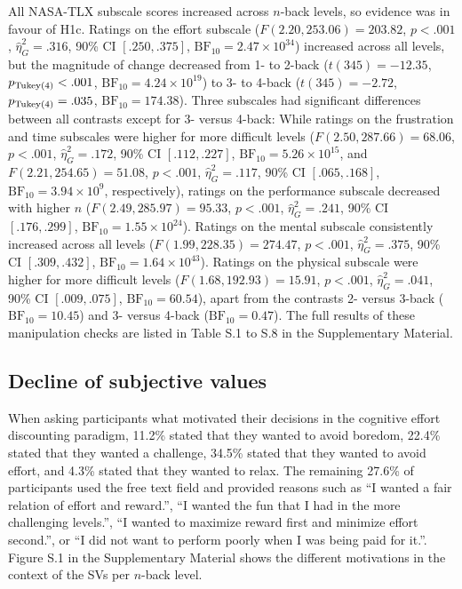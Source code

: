 \documentclass[
  man,floatsintext]{apa6}
\begin{document}
All NASA-TLX subscale scores increased across \(n\)-back levels, so evidence was in favour of H1c.
Ratings on the effort subscale (\(F(2.20, 253.06) = 203.82\), \(p < .001\), \(\hat{\eta}^2_G = .316\), 90\% CI \([.250, .375]\), \(\mathrm{BF}_{\textrm{10}} = 2.47 \times 10^{34}\)) increased across all levels, but the magnitude of change decreased from 1- to 2-back (\(t(345) = -12.35\), \(p_\mathrm{\scriptsize Tukey(4)} < .001\), \(\mathrm{BF}_{\textrm{10}} = 4.24 \times 10^{19}\)) to 3- to 4-back (\(t(345) = -2.72\), \(p_\mathrm{\scriptsize Tukey(4)} = .035\), \(\mathrm{BF}_{\textrm{10}} = 174.38\)).
Three subscales had significant differences between all contrasts except for 3- versus 4-back:
While ratings on the frustration and time subscales were higher for more difficult levels (\(F(2.50, 287.66) = 68.06\), \(p < .001\), \(\hat{\eta}^2_G = .172\), 90\% CI \([.112, .227]\), \(\mathrm{BF}_{\textrm{10}} = 5.26 \times 10^{15}\), and \(F(2.21, 254.65) = 51.08\), \(p < .001\), \(\hat{\eta}^2_G = .117\), 90\% CI \([.065, .168]\), \(\mathrm{BF}_{\textrm{10}} = 3.94 \times 10^{9}\), respectively), ratings on the performance subscale decreased with higher \(n\) (\(F(2.49, 285.97) = 95.33\), \(p < .001\), \(\hat{\eta}^2_G = .241\), 90\% CI \([.176, .299]\), \(\mathrm{BF}_{\textrm{10}} = 1.55 \times 10^{24}\)).
Ratings on the mental subscale consistently increased across all levels (\(F(1.99, 228.35) = 274.47\), \(p < .001\), \(\hat{\eta}^2_G = .375\), 90\% CI \([.309, .432]\), \(\mathrm{BF}_{\textrm{10}} = 1.64 \times 10^{43}\)).
Ratings on the physical subscale were higher for more difficult levels (\(F(1.68, 192.93) = 15.91\), \(p < .001\), \(\hat{\eta}^2_G = .041\), 90\% CI \([.009, .075]\), \(\mathrm{BF}_{\textrm{10}} = 60.54\)), apart from the contrasts 2- versus 3-back (\(\mathrm{BF}_{\textrm{10}} = 10.45\)) and 3- versus 4-back (\(\mathrm{BF}_{\textrm{10}} = 0.47\)).
The full results of these manipulation checks are listed in Table S.1 to S.8 in the Supplementary Material.

\hypertarget{decline-of-subjective-values}{%
\subsection{Decline of subjective values}\label{decline-of-subjective-values}}

When asking participants what motivated their decisions in the cognitive effort discounting paradigm, 11.2\% stated that they wanted to avoid boredom, 22.4\% stated that they wanted a challenge, 34.5\% stated that they wanted to avoid effort, and 4.3\% stated that they wanted to relax.
The remaining 27.6\% of participants used the free text field and provided reasons such as ``I wanted a fair relation of effort and reward.'', ``I wanted the fun that I had in the more challenging levels.'', ``I wanted to maximize reward first and minimize effort second.'', or ``I did not want to perform poorly when I was being paid for it.''.
Figure S.1 in the Supplementary Material shows the different motivations in the context of the SVs per \(n\)-back level.
\end{document}
